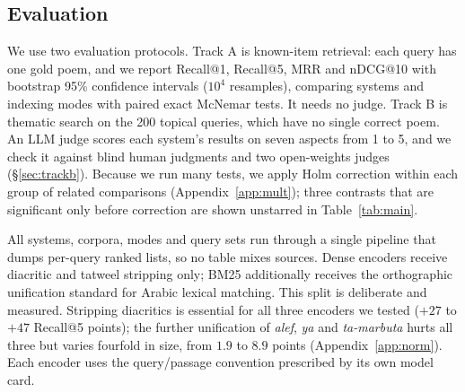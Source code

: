 \documentclass[11pt]{article}
\begin{document}
\begin{table}[t]
\centering\small
\setlength{\tabcolsep}{4pt}

\caption{The query-abstraction spectrum. \%\,quote is the share of queries sharing a verbatim three-token span with the target poem; $C$ is mean query-document containment against verses, AI explanations and FoF explanations. The FoF explanations are almost four times longer than the verses and reuse about half of each poem's vocabulary, which raises $C_{\mathrm{ff}}$. The AI explanations reuse about a fifth, so they lower overlap for queries that quote the poem and raise it for queries written as prose descriptions. Thematic queries ($n{=}200$) have no target poem and are used only in Track~B.}
\label{tab:data}
\end{table}

\subsection{Evaluation}
\label{sec:eval}

We use two evaluation protocols. Track A is known-item retrieval: each query has one gold poem, and we report Recall@1, Recall@5, MRR and nDCG@10 with bootstrap 95\% confidence intervals ($10^4$ resamples), comparing systems and indexing modes with paired exact McNemar tests. It needs no judge. Track B is thematic search on the 200 topical queries, which have no single correct poem. An LLM judge scores each system's results on seven aspects from 1 to 5, and we check it against blind human judgments and two open-weights judges (\S\ref{sec:trackb}). Because we run many tests, we apply Holm correction within each group of related comparisons (Appendix~\ref{app:mult}); three contrasts that are significant only before correction are shown unstarred in Table~\ref{tab:main}.

All systems, corpora, modes and query sets run through a single pipeline that dumps per-query ranked lists, so no table mixes sources. Dense encoders receive diacritic and tatweel stripping only; BM25 additionally receives the orthographic unification standard for Arabic lexical matching. This split is deliberate and measured. Stripping diacritics is essential for all three encoders we tested ($+27$ to $+47$ Recall@5 points); the further unification of \textit{alef}, \textit{ya} and \textit{ta-marbuta} hurts all three but varies fourfold in size, from $1.9$ to $8.9$ points (Appendix~\ref{app:norm}). Each encoder uses the query/passage convention prescribed by its own model card.
\end{document}
